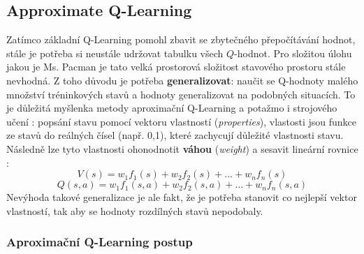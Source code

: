 \subsection{Approximate Q-Learning}
Zatímco základní Q-Learning pomohl zbavit se zbytečného přepočítávání hodnot, stále je potřeba si neustále udržovat tabulku všech $Q$-hodnot. Pro složitou úlohu jakou je Ms. Pacman je tato velká prostorová složitost stavového prostoru stále nevhodná. Z toho důvodu je potřeba \textbf{generalizovat}: naučit se Q-hodnoty malého množství tréninkových stavů a hodnoty generalizovat na podobných situacích. To je důležitá myšlenka metody aproximační Q-Learning a potažmo i strojového učení \cite{RLAprox}:
\newline
popsání stavu pomocí vektoru vlastností (\textit{properties}), vlastosti jsou funkce ze stavů do reálných čísel (např. 0,1), které zachycují důležité vlastnosti stavu. Následně lze tyto vlastnosti ohonodnotit \textbf{váhou} (\textit{weight}) a sesavit lineární rovnice \cite{RLAprox}:
\begin{displaymath}
V(s) = w_1f_1(s) + w_2f_2(s) + \dots + w_nf_n(s)
\end{displaymath}
\begin{displaymath}
Q(s,a) = w_1f_1(s,a) + w_2f_2(s,a) + \dots + w_nf_n(s,a)
\end{displaymath}
Nevýhoda takové generalizace je ale fakt, že je potřeba stanovit co nejlepší vektor vlastností, tak aby se hodnoty rozdílných stavů nepodobaly.
\subsubsection{Aproximační Q-Learning postup}

